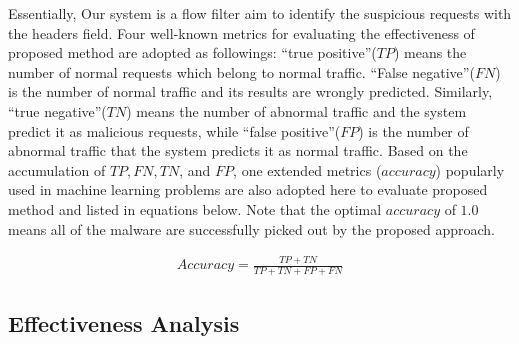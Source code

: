 Essentially, Our system is a flow filter aim to identify the suspicious requests with the headers field. Four well-known metrics for evaluating the effectiveness of proposed method are adopted as followings: ``true positive''($TP$) means the number of normal requests which belong to normal traffic. ``False negative''($FN$) is the number of normal traffic and its results are wrongly predicted. Similarly, ``true negative''($TN$) means the number of abnormal traffic and the system predict it as malicious requests, while ``false positive''($FP$) is the number of abnormal traffic that the system predicts it as normal traffic. Based on the accumulation of $TP, FN, TN$, and $FP$, one extended metrics ($accuracy$) popularly used in machine learning problems are also adopted here to evaluate proposed method and listed in equations below. Note that the optimal $accuracy$ of $1.0$ means all of the malware are successfully picked out by the proposed approach. 


\begin{eqnarray}
\label{eq:accuracy}
Accuracy = \frac{TP+TN}{TP+TN+FP+FN}
\end{eqnarray}

\subsection{Effectiveness Analysis}

